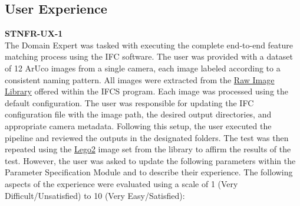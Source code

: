 \documentclass[12pt, titlepage]{article}
\begin{document}
\subsection{User Experience}
\textbf{STNFR-UX-1}\\
The Domain Expert was tasked with executing the complete end-to-end feature matching process using the IFC software. The user was provided with a dataset of 12 ArUco images from a single camera, each image labeled according to a consistent naming pattern. All images were extracted from the \href{https://github.com/KiranSingh15/CAS-741-Image-Correspondences/tree/main/src/projectFiles/Raw_Image_Lib}{Raw Image Library} offered within the IFCS program. Each image was processed using the default configuration. 
\newline
\newline
The user was responsible for updating the IFC configuration file with the image path, the desired output directories, and appropriate camera metadata. Following this setup, the user executed the pipeline and reviewed the outputs in the designated folders.
\newline
\newline
The test was then repeated using the \href{https://github.com/KiranSingh15/CAS-741-Image-Correspondences/tree/main/src/projectFiles/Raw_Image_Lib/Lego2}{Lego2} image set from the library to affirm the results of the test. However, the user was asked to update the following parameters within the Parameter Specification Module and to describe their experience.
\newline
\newline
The following aspects of the experience were evaluated using a scale of 1 (Very Difficult/Unsatisfied) to 10 (Very Easy/Satisfied):
\end{document}
